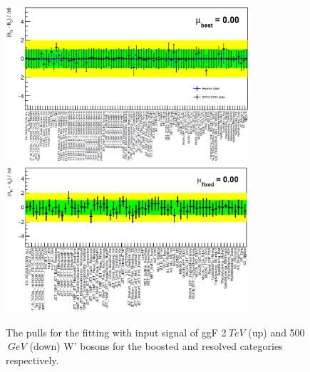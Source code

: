 \begin{figure}[!h]                
	\includegraphics[width=0.81\textwidth]{Chapter4/NuiPull_ggFHVT2000.png}
	 \vspace{5mm}
	\includegraphics[width=0.81\textwidth]{Chapter4/NuiPull_ggFHVT500.png}
	\centering
	\begin{center}
		\caption{The pulls for the fitting with input signal of ggF 2$~TeV$ (up) and  500$~GeV$ (down) W' bosons for the boosted and resolved categories respectively.}
		\label{Fig:pull_HVT}            
	\end{center}
\end{figure} 
